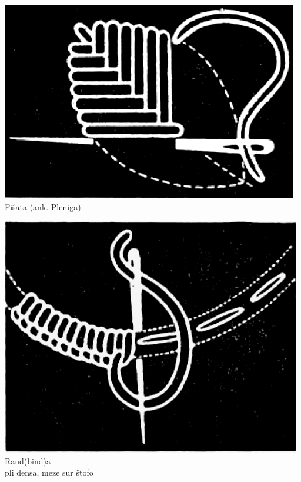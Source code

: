 \begin{center}\includegraphics[keepaspectratio,width=\textwidth,height=0.75\textheight]{7.png}\\
Fiŝata (ank. Pleniga)\end{center}

\begin{center}\includegraphics[keepaspectratio,width=\textwidth,height=0.75\textheight]{8.png}\\
Rand(bind)a\\
pli densa, meze sur ŝtofo\end{center}


